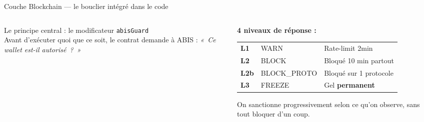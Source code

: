 \documentclass[aspectratio=169,12pt]{beamer}
\newcommand{\yes}{\textcolor{success}{\ding{51}}}
\newcommand{\no}{\textcolor{danger}{\ding{55}}}
\begin{document}
\begin{frame}{Couche Blockchain --- le bouclier intégré dans le code}
  \begin{columns}[T]
    \begin{column}{0.50\textwidth}
      Le principe central : le modificateur \texttt{\color{primary}abisGuard}\\[0.15cm]
      {\small Avant d'exécuter quoi que ce soit, le contrat demande à ABIS :
      \textit{«~Ce wallet est-il autorisé~?~»}}\\[0.25cm]
    \end{column}
    \begin{column}{0.46\textwidth}
      \textbf{4 niveaux de réponse :}\\[0.25cm]
      \begin{tabular}{p{0.6cm} p{1.8cm} p{2.8cm}}
        {\color{success}\bfseries L1} & WARN & Rate-limit 2min\\[0.15cm]
        {\color{accent}\bfseries L2} & BLOCK & Bloqué 10 min partout\\[0.15cm]
        {\color{accent}\bfseries L2b} & BLOCK\_PROTO & Bloqué sur 1 protocole\\[0.15cm]
        {\color{danger}\bfseries L3} & FREEZE & Gel \textbf{permanent}\\
      \end{tabular}
      \vspace{0.3cm}
      {\small\color{midgray} On sanctionne progressivement selon ce qu'on observe, sans tout bloquer d'un coup.}
    \end{column}
  \end{columns}
\end{frame}
\end{document}
